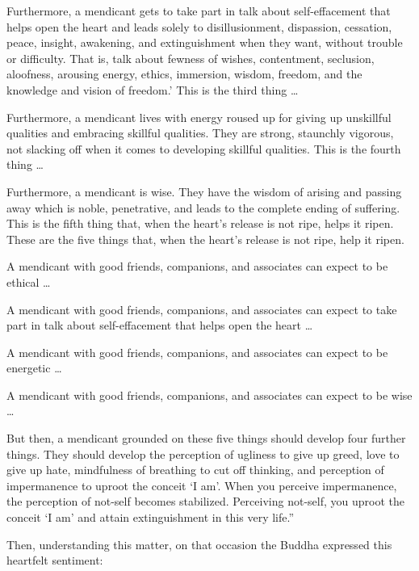 \documentclass[12pt,openany]{book}%
\begin{document}
Furthermore, a mendicant gets to take part in talk about self-effacement that helps open the heart and leads solely to disillusionment, dispassion, cessation, peace, insight, awakening, and extinguishment when they want, without trouble or difficulty. That is, talk about fewness of wishes, contentment, seclusion, aloofness, arousing energy, ethics, immersion, wisdom, freedom, and the knowledge and vision of freedom.’ This is the third thing … 

Furthermore, a mendicant lives with energy roused up for giving up unskillful qualities and embracing skillful qualities. They are strong, staunchly vigorous, not slacking off when it comes to developing skillful qualities. This is the fourth thing … 

Furthermore, a mendicant is wise. They have the wisdom of arising and passing away which is noble, penetrative, and leads to the complete ending of suffering. This is the fifth thing that, when the heart’s release is not ripe, helps it ripen. These are the five things that, when the heart’s release is not ripe, help it ripen. 

A mendicant with good friends, companions, and associates can expect to be ethical … 

A mendicant with good friends, companions, and associates can expect to take part in talk about self-effacement that helps open the heart … 

A mendicant with good friends, companions, and associates can expect to be energetic … 

A mendicant with good friends, companions, and associates can expect to be wise … 

But then, a mendicant grounded on these five things should develop four further things. They should develop the perception of ugliness to give up greed, love to give up hate, mindfulness of breathing to cut off thinking, and perception of impermanence to uproot the conceit ‘I am’. When you perceive impermanence, the perception of not-self becomes stabilized. Perceiving not-self, you uproot the conceit ‘I am’ and attain extinguishment in this very life.” 

Then, understanding this matter, on that occasion the Buddha expressed this heartfelt sentiment: 
\end{document}
